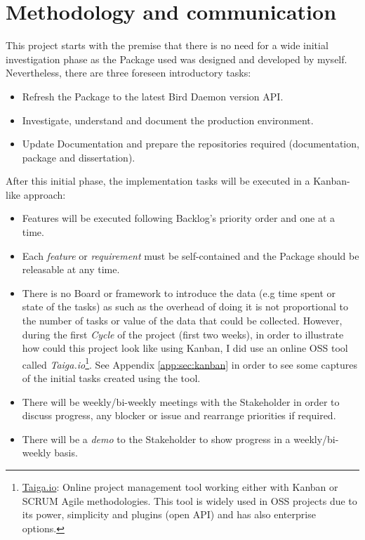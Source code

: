 \section{Methodology and communication}
This project starts with the premise that there is no need for a wide initial investigation phase as the Package used was designed and developed by myself. Nevertheless, there are three foreseen introductory tasks:
\begin{itemize}
    \item Refresh the Package to the latest Bird Daemon version API. 
    \item Investigate, understand and document the production environment.
    \item Update Documentation and prepare the repositories required (documentation, package and dissertation).
\end{itemize}

After this initial phase, the implementation tasks will be executed in a Kanban-like approach:
\begin{itemize}
    \item Features will be executed following Backlog's priority order and one at a time.
    \item Each \textit{feature} or \textit{requirement} must be self-contained and the Package should be releasable at any time.
    \item There is no Board or framework to introduce the data (e.g time spent or state of the tasks) as such as the overhead of doing it is not proportional to the number of tasks or value of the data that could be collected. However, during the first \textit{Cycle} of the project (first two weeks), in order to illustrate how could this project look like using Kanban, I did use an online OSS tool called \textit{Taiga.io}\footnote{\href{https://taiga.io/}{Taiga.io}: Online project management tool working either with Kanban or SCRUM Agile methodologies. This tool is widely used in OSS projects due to its power, simplicity and plugins (open API) and has also enterprise options.}. See Appendix \ref{app:sec:kanban} in order to see some captures of the initial tasks created using the tool.
    \item There will be weekly/bi-weekly meetings with the Stakeholder in order to discuss progress, any blocker or issue and rearrange priorities if required.
    \item There will be a \textit{demo} to the Stakeholder to show progress in a weekly/bi-weekly basis.
\end{itemize}


